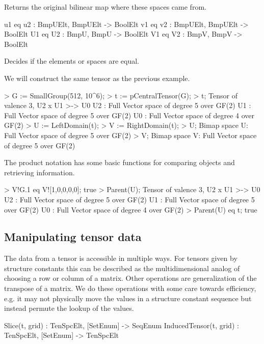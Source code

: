 Returns the original bilinear map where these spaces came from.

\begin{intrinsics}
u1 eq u2 : BmpUElt, BmpUElt -> BoolElt
v1 eq v2 : BmpUElt, BmpUElt -> BoolElt
U1 eq U2 : BmpU, BmpU -> BoolElt
V1 eq V2 : BmpV, BmpV -> BoolElt
\end{intrinsics}

Decides if the elements or spaces are equal.

\begin{example}[BimapProduct2]

We will construct the same tensor as the previous example.
\begin{code}
> G := SmallGroup(512, 10^6);
> t := pCentralTensor(G);
> t;
Tensor of valence 3, U2 x U1 >-> U0
U2 : Full Vector space of degree 5 over GF(2)
U1 : Full Vector space of degree 5 over GF(2)
U0 : Full Vector space of degree 4 over GF(2)
> U := LeftDomain(t);
> V := RightDomain(t);
> U;
Bimap space U: Full Vector space of degree 5 over GF(2)
> V;
Bimap space V: Full Vector space of degree 5 over GF(2)
\end{code}

The product notation has some basic functions for comparing objects and retrieving information.
\begin{code}
> V!G.1 eq V![1,0,0,0,0];
true
> Parent(U);
Tensor of valence 3, U2 x U1 >-> U0
U2 : Full Vector space of degree 5 over GF(2)
U1 : Full Vector space of degree 5 over GF(2)
U0 : Full Vector space of degree 4 over GF(2)
> Parent(U) eq t;
true
\end{code}
\end{example}


\subsection{Manipulating tensor data} 
The data from a tensor is accessible in multiple ways. For tensors given by
structure constants this can be described as the multidimensional analog of
choosing a row or column of a matrix. Other operations are generalization of the
transpose of a matrix. We do these operations with some care towards efficiency,
e.g.\! it may not physically move the values in a structure constant sequence
but instead permute the lookup of the values.


\begin{intrinsics}
Slice(t, grid) : TenSpcElt, [SetEnum] -> SeqEnum
InducedTensor(t, grid) : TenSpcElt, [SetEnum] -> TenSpcElt
\end{intrinsics}

